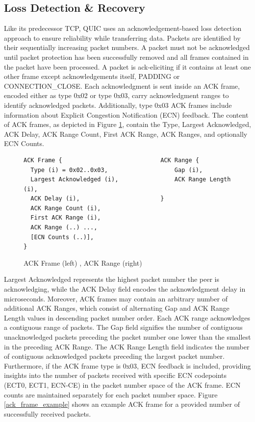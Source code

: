 \subsection{Loss Detection \& Recovery}

Like its predecessor TCP, QUIC uses an acknowledgement-based loss detection approach to ensure reliability while transferring data. Packets are identified by their sequentially increasing packet numbers. A packet must not be acknowledged until packet protection has been successfully removed and all frames contained in the packet have been processed. A packet is ack-eliciting if it contains at least one other frame except acknowledgements itself, PADDING or CONNECTION\_CLOSE. Each acknowledgment is sent inside an ACK frame, encoded either as type 0x02 or type 0x03, carry acknowledgment ranges to identify acknowledged packets. Additionally, type 0x03 ACK frames include information about Explicit Congestion Notification (ECN) feedback. The content of ACK frames, as depicted in Figure \ref{ack_frame}, contain the Type, Largest Acknowledged, ACK Delay, ACK Range Count, First ACK Range, ACK Ranges, and optionally ECN Counts. 

\begin{figure}[htb]
    \centering      
\begin{verbatim}
ACK Frame {                            ACK Range {
  Type (i) = 0x02..0x03,                   Gap (i),
  Largest Acknowledged (i),                ACK Range Length (i),
  ACK Delay (i),                       }
  ACK Range Count (i),        
  First ACK Range (i),        
  ACK Range (..) ...,         
  [ECN Counts (..)],          
}
\end{verbatim}
    \caption{ACK Frame (left) \cite[106]{rfc9000}, ACK Range (right) \cite[107]{rfc9000}}
    \label{ack_frame}
\end{figure}

Largest Acknowledged represents the highest packet number the peer is acknowledging, while the ACK Delay field encodes the acknowledgment delay in microseconds. Moreover, ACK frames may contain an arbitrary number of additional ACK Ranges, which consist of alternating Gap and ACK Range Length values in descending packet number order. Each ACK range acknowledges a contiguous range of packets. The Gap field signifies the number of contiguous unacknowledged packets preceding the packet number one lower than the smallest in the preceding ACK Range. The ACK Range Length field indicates the number of contiguous acknowledged packets preceding the largest packet number. Furthermore, if the ACK frame type is 0x03, ECN feedback is included, providing insights into the number of packets received with specific ECN codepoints (ECT0, ECT1, ECN-CE) in the packet number space of the ACK frame. ECN counts are maintained separately for each packet number space. Figure \ref{ack_frame_example} shows an example ACK frame for a provided number of successfully received packets.

